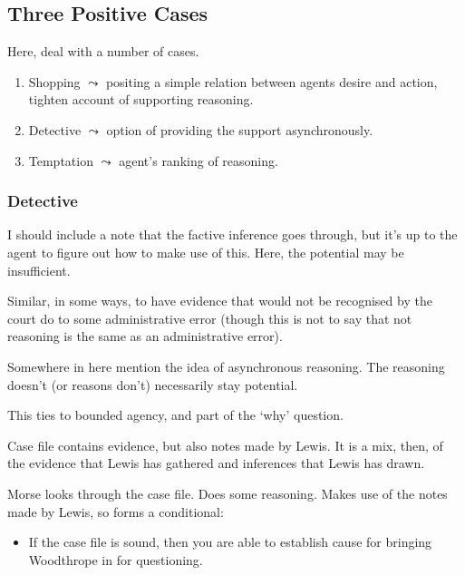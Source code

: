 \documentclass[10pt]{article}
\begin{document}
\subsection{Three Positive Cases}
\label{sec:positive-cases}

\begin{note}[Cases]
  Here, deal with a number of cases.
  \begin{enumerate}
  \item Shopping \(\leadsto\) positing a simple relation between agents desire and action, tighten account of supporting reasoning.
  \item Detective \(\leadsto\) option of providing the support asynchronously.
  \item Temptation \(\leadsto\) agent's ranking of reasoning.
  \end{enumerate}
\end{note}


\subsubsection{Detective}
\label{sec:detective}

\begin{note}
  I should include a note that the factive inference goes through, but it's up to the agent to figure out how to make use of this.
  Here, the potential may be insufficient.

  Similar, in some ways, to have evidence that would not be recognised by the court do to some administrative error (though this is not to say that not reasoning is the same as an administrative error).
\end{note}

\begin{note}[Async]
  Somewhere in here mention the idea of asynchronous reasoning.
  The reasoning doesn't (or reasons don't) necessarily stay potential.

  This ties to bounded agency, and part of the `why' question.
\end{note}

\begin{scenario}

  Case file contains evidence, but also notes made by Lewis.
  It is a mix, then, of the evidence that Lewis has gathered and inferences that Lewis has drawn.

  Morse looks through the case file.
  Does some reasoning.
  Makes use of the notes made by Lewis, so forms a conditional:

  \begin{itemize}
  \item If the case file is sound, then you are able to establish cause for bringing Woodthrope in for questioning.
  \end{itemize}

\end{scenario}
\end{document}
